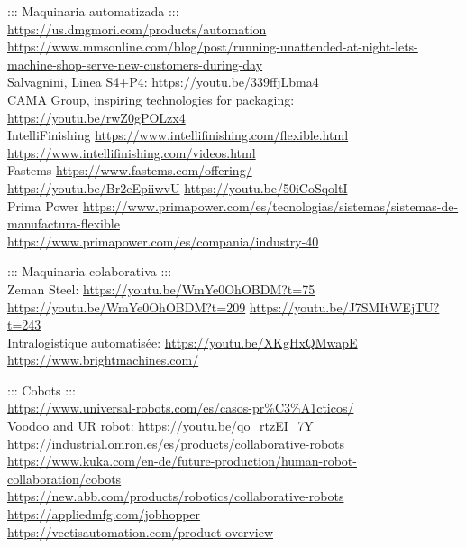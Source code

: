 \documentclass[spanish,12pt,a4paper,final,oneside]{book}
\begin{document}
::: Maquinaria automatizada :::
\\ \url{https://us.dmgmori.com/products/automation}
\\ {\footnotesize \url{https://www.mmsonline.com/blog/post/running-unattended-at-night-lets-machine-shop-serve-new-customers-during-day}}
\\Salvagnini, Linea S4+P4: \url{https://youtu.be/339ffjLbma4}
\\CAMA Group, inspiring technologies for packaging: \url{https://youtu.be/rwZ0gPOLzx4}
\\IntelliFinishing \url{https://www.intellifinishing.com/flexible.html}
\\ \url{https://www.intellifinishing.com/videos.html}
\\Fastems \url{https://www.fastems.com/offering/}
\\ \url{https://youtu.be/Br2eEpiiwvU} \hspace{0.3cm} \url{https://youtu.be/50iCoSqoltI}
\\ Prima Power \url{https://www.primapower.com/es/tecnologias/sistemas/sistemas-de-manufactura-flexible}
\\ \url{https://www.primapower.com/es/compania/industry-40}

::: Maquinaria colaborativa :::
\\Zeman Steel: \url{https://youtu.be/WmYe0OhOBDM?t=75} \hspace{0.3cm} \url{https://youtu.be/WmYe0OhOBDM?t=209} \hspace{0.3cm} \url{https://youtu.be/J7SMItWEjTU?t=243}
\\Intralogistique automatisée: \url{https://youtu.be/XKgHxQMwapE}
\\ \url{https://www.brightmachines.com/}

::: Cobots :::
\\ \url{https://www.universal-robots.com/es/casos-pr%C3%A1cticos/}
\\ Voodoo and UR robot: \url{https://youtu.be/qo_rtzEI_7Y}
\\ \url{https://industrial.omron.es/es/products/collaborative-robots}
\\ \url{https://www.kuka.com/en-de/future-production/human-robot-collaboration/cobots}
\\ \url{https://new.abb.com/products/robotics/collaborative-robots}
\\ \url{https://appliedmfg.com/jobhopper}
\\ \url{https://vectisautomation.com/product-overview}
\end{document}
